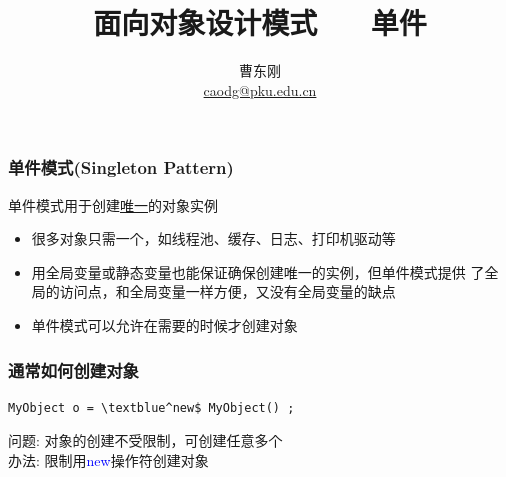 \documentclass[compress]{beamer}
\newcommand{\textblue}[1]{\textcolor{blue}{#1}}
\begin{document}

					
\title[单件模式]{面向对象设计模式 ~~ 单件}

\author[曹东刚]
{曹东刚\\\href{mailto:caodg@pku.edu.cn}{caodg@pku.edu.cn}}


\date{}


\begin{frame}[plain]
	\titlepage
\end{frame}

\setcounter{framenumber}{0}

\begin{frame}
  \frametitle{单件模式(Singleton Pattern)}
  单件模式用于创建\uline{唯一}的对象实例
  \begin{itemize}
    \item 很多对象只需一个，如线程池、缓存、日志、打印机驱动等
    \item 用全局变量或静态变量也能保证确保创建唯一的实例，但单件模式提供
      了全局的访问点，和全局变量一样方便，又没有全局变量的缺点
    \item 单件模式可以允许在需要的时候才创建对象
  \end{itemize}

  \vspace*{2ex}
\end{frame}

\begin{frame}[fragile]
  \frametitle{通常如何创建对象}

\begin{Verbatim}[label=常见的创建对象的方式, commandchars=\\\^\$]
    MyObject o = \textblue^new$ MyObject() ;
\end{Verbatim}

\alert{问题}: 对象的创建不受限制，可创建任意多个 \\
\alert{办法}: 限制用\textblue{new}操作符创建对象 \\[4ex]

\end{frame}
\end{document}
